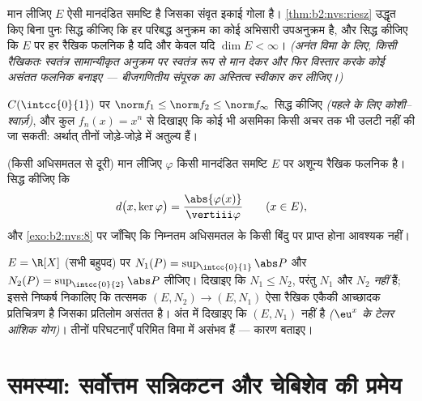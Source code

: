 \begin{exercise}[$\star\star\star$]\label{exo:b2:nvs:9}
मान लीजिए $E$ ऐसी मानदंडित समष्टि है जिसका संवृत इकाई गोला  है। \cref{thm:b2:nvs:riesz}
उद्धृत किए बिना पुनः सिद्ध कीजिए कि हर परिबद्ध अनुक्रम का कोई अभिसारी
उपअनुक्रम है, और सिद्ध कीजिए कि $E$ पर हर रैखिक फलनिक  है यदि और
केवल यदि $\dim E < \infty$। \emph{(अनंत विमा के लिए, किसी रैखिकतः स्वतंत्र
सामान्यीकृत अनुक्रम पर स्वतंत्र रूप से मान देकर और फिर विस्तार करके कोई
असंतत फलनिक बनाइए --- बीजगणितीय संपूरक का अस्तित्व स्वीकार कर लीजिए।)}
\end{exercise}

\begin{exercise}[$\star\star$]\label{exo:b2:nvs:10}
$C(\intcc{0}{1})$ पर $\norm f_1 \leq \norm f_2 \leq \norm
f_\infty$ सिद्ध कीजिए \emph{(पहले के लिए कोशी--श्वार्ज़)}, और कुल $f_n(x) = x^n$
से दिखाइए कि कोई भी असमिका किसी अचर तक भी उलटी नहीं की जा सकती: अर्थात्
तीनों  जोड़े-जोड़े में अतुल्य हैं।
\end{exercise}

\begin{exercise}[$\star\star$]\label{exo:b2:nvs:11}
(किसी अधिसमतल से दूरी) मान लीजिए $\varphi$ किसी मानदंडित समष्टि $E$ पर अशून्य
 रैखिक फलनिक है। सिद्ध कीजिए कि
\[
d\bigl(x, \ker\varphi\bigr) =
\frac{\abs{\varphi(x)}}{\vertiii\varphi}
\qquad (x \in E),
\]
और \cref{exo:b2:nvs:8} पर जाँचिए कि निम्नतम अधिसमतल के किसी बिंदु पर प्राप्त होना
आवश्यक नहीं।
\end{exercise}

\begin{exercise}[$\star\star\star$]\label{exo:b2:nvs:12}
$E = \R[X]$ (सभी बहुपद) पर $N_1(P) =
\sup_{\intcc{0}{1}}\abs P$ और $N_2(P) =
\sup_{\intcc{0}{2}}\abs P$ लीजिए। दिखाइए कि $N_1 \leq N_2$, परंतु $N_1$ और $N_2$
 \emph{नहीं} हैं; इससे निष्कर्ष निकालिए कि तत्समक $(E, N_2) \to (E, N_1)$ ऐसा 
रैखिक एकैकी आच्छादक प्रतिचित्रण है जिसका प्रतिलोम असंतत है। अंत में
दिखाइए कि $(E, N_1)$  नहीं है \emph{($\eu^x$ के टेलर आंशिक योग)}। तीनों
परिघटनाएँ परिमित विमा में असंभव हैं --- कारण बताइए।
\end{exercise}

\section{समस्या: सर्वोत्तम सन्निकटन और चेबिशेव की प्रमेय}

